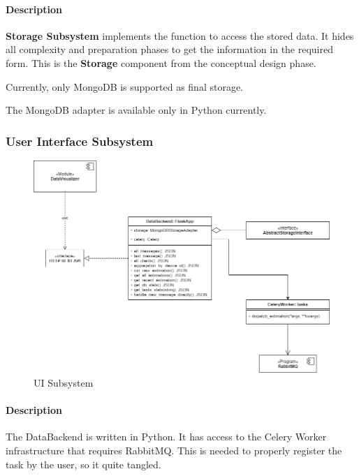 \paragraph{Description}\label{description-1}

\textbf{Storage Subsystem} implements the function to access the stored
data. It hides all complexity and preparation phases to get the
information in the required form. This is the \textbf{Storage} component
from the conceptual design phase.

Currently, only MongoDB is supported as final storage.

The MongoDB adapter is available only in Python currently.

\subsubsection{User Interface
Subsystem}\label{user-interface-subsystem}

\begin{figure}[!h]
	\centering
	\includegraphics[width=\linewidth, keepaspectratio]{schemes/classes/ClassDiagram-ui_subsystem.png}
\caption{UI Subsystem}
\end{figure}

\paragraph{Description}\label{description-2}

The DataBackend is written in Python. It has access to the Celery Worker
infrastructure that requires RabbitMQ. This is needed to properly
register the task by the user, so it quite tangled.

